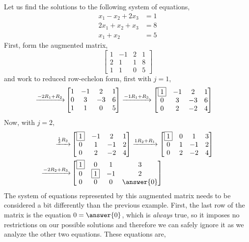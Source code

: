 \documentclass{ximera}
\begin{document}
\begin{example}
Let us find the solutions to the following system of equations,
\begin{align*}
x_1 -x_2 +2x_3 & =1\\
2x_1+ x_2 + x_3 & =8\\
x_1 + x_2 & =5
\end{align*}
First, form the augmented matrix,
\[
\begin{bmatrix}
1 & -1 & 2 & 1\\
2 & 1 & 1 & 8\\
1 & 1 & 0 & 5
\end{bmatrix}
\]
and work to reduced row-echelon form, first with $j=1$,
\begin{align*}
\xrightarrow{-2R_{1}+R_{2}}
&
\begin{bmatrix}
1 & -1 & 2 & 1\\
0 & 3 & -3 & 6\\
1 & 1 & 0 & 5
\end{bmatrix}
\xrightarrow{-1R_{1}+R_{3}}
\begin{bmatrix}
\fbox{1} & -1 & 2 & 1\\
0 & 3 & -3 & 6\\
0 & 2 & -2 & 4
\end{bmatrix}
\end{align*}
Now, with $j=2$,
\begin{align*}
\xrightarrow{\rowopmult{\frac{1}{3}}{2}}
&
\begin{bmatrix}
\leading{1} & -1 & 2 & 1\\
0 & 1 & -1 & 2\\
0 & 2 & -2 & 4
\end{bmatrix}
\xrightarrow{\rowopadd{1}{2}{1}}
\begin{bmatrix}
\leading{1} & 0 & 1 & 3\\
0 & 1 & -1 & 2\\
0 & 2 & -2 & 4
\end{bmatrix}\\
\xrightarrow{\rowopadd{-2}{2}{3}}
&
\begin{bmatrix}
\leading{1} & 0 & 1 & 3\\
0 & \leading{1} & -1 & 2\\
0 & 0 & 0 & \answer{0}
\end{bmatrix}
\end{align*}
The system of equations represented by this augmented matrix needs to be considered a bit differently than the previous example.  First, the last row of the matrix is the equation $0=\answer{0}$, which is \textit{always} true, so it imposes no restrictions on our possible solutions and therefore we can safely ignore it as we analyze the other two equations.  These equations are,

\end{example}
\end{document}
